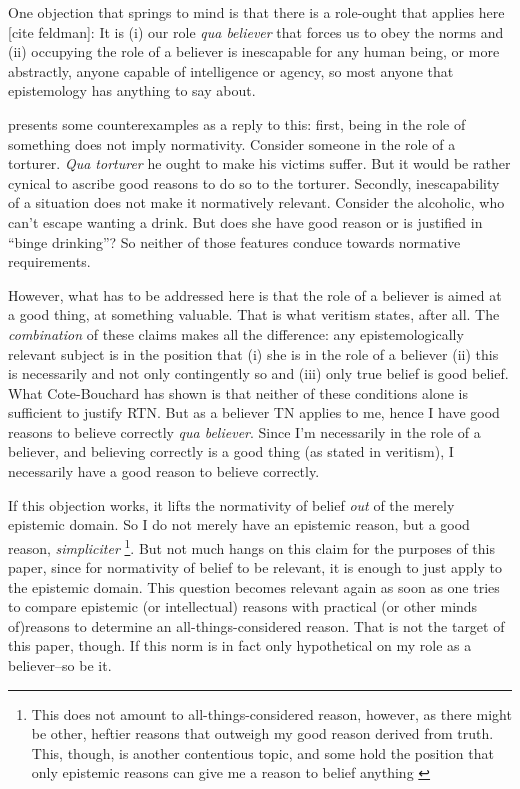 \documentclass[12pt,numbers=noenddot]{scrartcl}
\begin{document}
One objection that springs to mind is that there is a role-ought that applies here [cite feldman]: It is (i) our role \emph{qua believer} that forces us to obey the norms and (ii) occupying the role of a believer is inescapable for any human being, or more abstractly, anyone capable of intelligence or agency, so most anyone that epistemology has anything to say about.

\textcite[9]{Cote-BouchardForthcoming-CTBCTA} presents some counterexamples as a reply to this: first, being in the role of something does not imply normativity. Consider someone in the role of a torturer. \emph{Qua torturer} he ought to make his victims suffer. But it would be rather cynical to ascribe good reasons to do so to the torturer. Secondly, inescapability of a situation does not make it normatively relevant. Consider the alcoholic, who can't escape wanting a drink. But does she have good reason or is justified in “binge drinking”? So neither of those features conduce towards normative requirements.

However, what has to be addressed here is that the role of a believer is aimed at a good thing, at something valuable. That is what veritism states, after all. The \emph{combination} of these claims makes all the difference: any epistemologically relevant subject is in the position that (i) she is in the role of a believer (ii) this is necessarily and not only contingently so and (iii) only true belief is good belief. What Cote-Bouchard has shown is that neither of these conditions alone is sufficient to justify RTN. But as a believer TN applies to me, hence I have good reasons to believe correctly \emph{qua believer}. Since I'm necessarily in the role of a believer, and believing correctly is a good thing (as stated in veritism), I necessarily have a good reason to believe correctly.

If this objection works, it lifts the normativity of belief \emph{out} of the merely epistemic domain. So I do not merely have an epistemic reason, but a good reason, \emph{simpliciter}
\footnote{This does not amount to all-things-considered reason, however, as there might be other, heftier reasons that outweigh my good reason derived from truth. This, though, is another contentious topic, and some hold the position that only epistemic reasons can give me a reason to belief anything \autocite{Kelly2003-KELERA}}.
But not much hangs on this claim for the purposes of this paper, since for normativity of belief to be relevant, it is enough to just apply to the epistemic domain. This question becomes relevant again as soon as one tries to compare epistemic (or intellectual) reasons with practical (or other minds of)reasons to determine an all-things-considered reason. That is not the target of this paper, though. If this norm is in fact  only hypothetical on my role as a believer–so be it.
\end{document}
